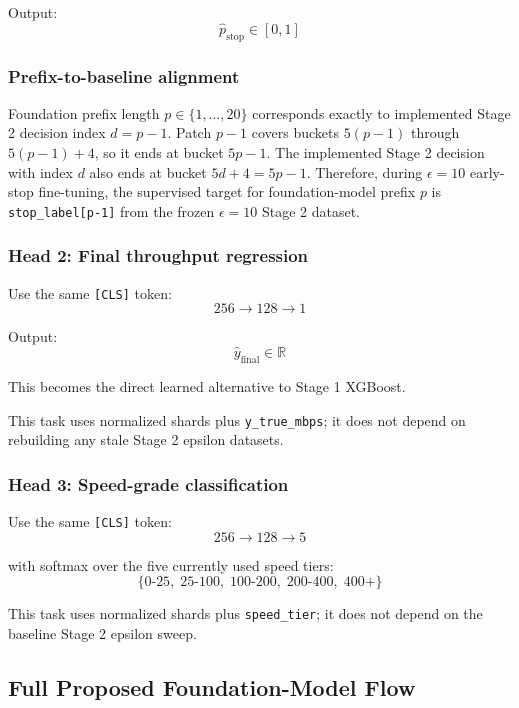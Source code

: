 \documentclass[11pt]{article}
\begin{document}
Output:
\[
\hat{p}_{\text{stop}} \in [0,1]
\]

\subsubsection*{Prefix-to-baseline alignment}

Foundation prefix length \(p \in \{1,\dots,20\}\) corresponds exactly to implemented Stage 2 decision index \(d = p - 1\). Patch \(p-1\) covers buckets \(5(p-1)\) through \(5(p-1)+4\), so it ends at bucket \(5p-1\). The implemented Stage 2 decision with index \(d\) also ends at bucket \(5d+4 = 5p-1\). Therefore, during \(\epsilon = 10\) early-stop fine-tuning, the supervised target for foundation-model prefix \(p\) is \texttt{stop\_label[p-1]} from the frozen \(\epsilon = 10\) Stage 2 dataset.

\subsubsection{Head 2: Final throughput regression}

Use the same \texttt{[CLS]} token:
\[
256 \rightarrow 128 \rightarrow 1
\]

Output:
\[
\hat{y}_{\text{final}} \in \mathbb{R}
\]

This becomes the direct learned alternative to Stage 1 XGBoost.

This task uses normalized shards plus \texttt{y\_true\_mbps}; it does not depend on rebuilding any stale Stage 2 epsilon datasets.

\subsubsection{Head 3: Speed-grade classification}

Use the same \texttt{[CLS]} token:
\[
256 \rightarrow 128 \rightarrow 5
\]

with softmax over the five currently used speed tiers:
\[
\{0\text{-}25,\;25\text{-}100,\;100\text{-}200,\;200\text{-}400,\;400+\}
\]

This task uses normalized shards plus \texttt{speed\_tier}; it does not depend on the baseline Stage 2 epsilon sweep.

\subsection{Full Proposed Foundation-Model Flow}
\end{document}
